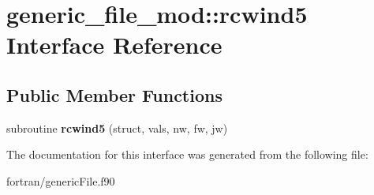 \hypertarget{interfacegeneric__file__mod_1_1rcwind5}{}\section{generic\+\_\+file\+\_\+mod\+:\+:rcwind5 Interface Reference}
\label{interfacegeneric__file__mod_1_1rcwind5}
\subsection*{Public Member Functions}
\begin{DoxyCompactItemize}
\item 
\mbox{\label{interfacegeneric__file__mod_1_1rcwind5_a74812817b2c824d0ac33f6375fc5db9e}} 
subroutine {\bfseries rcwind5} (struct, vals, nw, fw, jw)
\end{DoxyCompactItemize}


The documentation for this interface was generated from the following file\+:\begin{DoxyCompactItemize}
\item 
fortran/generic\+File.\+f90\end{DoxyCompactItemize}
